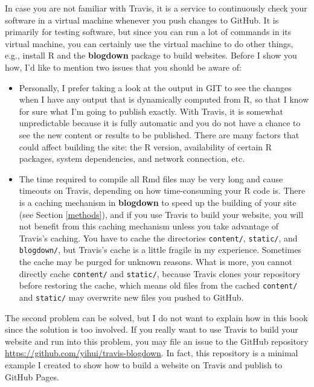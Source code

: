 \documentclass[12pt,]{krantz}
\theoremstyle{definition}
\theoremstyle{definition}
\theoremstyle{definition}
\theoremstyle{remark}
\begin{document}
In case you are not familiar with Travis, it is a service to
continuously check your software in a virtual machine whenever you push
changes to GitHub. It is primarily for testing software, but since you
can run a lot of commands in its virtual machine, you can certainly use
the virtual machine to do other things, e.g., install R and the
\textbf{blogdown} package to build websites. Before I show you how, I'd
like to mention two issues that you should be aware of:

\begin{itemize}
\item
  Personally, I prefer taking a look at the output in GIT to see the
  changes when I have any output that is dynamically computed from R, so
  that I know for sure what I'm going to publish exactly. With Travis,
  it is somewhat unpredictable because it is fully automatic and you do
  not have a chance to see the new content or results to be published.
  There are many factors that could affect building the site: the R
  version, availability of certain R packages, system dependencies, and
  network connection, etc.
\item
  The time required to compile all Rmd files may be very long and cause
  timeouts on Travis, depending on how time-consuming your R code is.
  There is a caching mechanism in \textbf{blogdown} to speed up the
  building of your site (see Section \ref{methods}), and if you use
  Travis to build your website, you will not benefit from this caching
  mechanism unless you take advantage of Travis's caching. You have to
  cache the directories \texttt{content/}, \texttt{static/}, and
  \texttt{blogdown/}, but Travis's cache is a little fragile in my
  experience. Sometimes the cache may be purged for unknown reasons.
  What is more, you cannot directly cache \texttt{content/} and
  \texttt{static/}, because Travis clones your repository before
  restoring the cache, which means old files from the cached
  \texttt{content/} and \texttt{static/} may overwrite new files you
  pushed to GitHub.
\end{itemize}

The second problem can be solved, but I do not want to explain how in
this book since the solution is too involved. If you really want to use
Travis to build your website and run into this problem, you may file an
issue to the GitHub repository
\url{https://github.com/yihui/travis-blogdown}. In fact, this repository
is a minimal example I created to show how to build a website on Travis
and publish to GitHub Pages.
\end{document}
